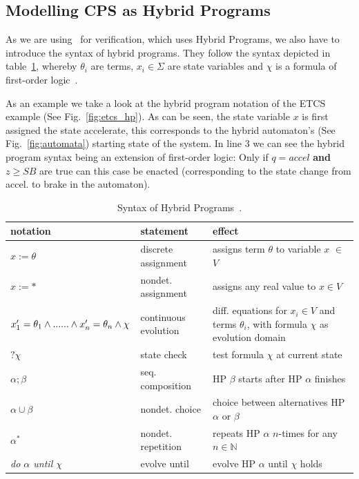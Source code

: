 \subsection{Modelling CPS as Hybrid Programs}

As we are using \keym~for verification, which uses Hybrid Programs, we also have to introduce the syntax of hybrid programs. They follow the syntax depicted in table~\ref{tab:hp}, whereby \(\theta_i\) are terms, \(x_i \in \Sigma\) are state variables and \(\chi\) is a formula of first-order logic~\cite{platzer2010b}.

As an example we take a look at the hybrid program notation of the ETCS example (See Fig.~\ref{fig:etcs_hp}). As can be seen, the state variable \(x\) is first assigned the state accelerate, this corresponds to the hybrid automaton's (See Fig.~\ref{fig:automata}) starting state of the system. In line 3 we can see the hybrid program syntax being an extension of first-order logic: Only if \(q=accel\) \textbf{and} \(z \geq SB\) are true can this case be enacted (corresponding to the state change from accel. to brake in the automaton).

\begin{table}
	\begin{tabular}{p{5cm} | p{4cm} | p{6cm} }
		notation & statement & effect \\ \hline
		\(x := \theta\) & discrete assignment & assigns term \(\theta\) to variable \(x\) \(\in\) \(V\) \\
		\(x := \ast\) & nondet. assignment & assigns any real value to \(x \in V\) \\
		\(x^{\prime}_1 = \theta_1 \wedge ... \newline
		... \wedge x^{\prime}_n = \theta_n \wedge \chi\) & continuous evolution & diff. equations for \(x_i \in V\) and terms \(\theta_i\),\newline
		with formula \(\chi\) as evolution domain \\
		\(?\chi\) & state check & test formula \(\chi\) at current state \\
		\(\alpha;\beta\) & seq. composition & HP \(\beta\) starts after HP \(\alpha\) finishes \\
		\(\alpha \cup \beta\) & nondet. choice & choice between alternatives HP \(\alpha\) or \(\beta\) \\
		\(\alpha^\ast\) & nondet. repetition & repeats HP \(\alpha\) \(n\)-times for any \(n \in \mathbb{N}\) \\
		\it{do} \(\alpha\) \it{until} \(\chi\) & evolve until &  evolve HP \(\alpha\) until \(\chi\) holds \\
	\end{tabular}
	\caption{Syntax of Hybrid Programs~\cite{platzer2010b}.}
	\label{tab:hp}
\end{table}

